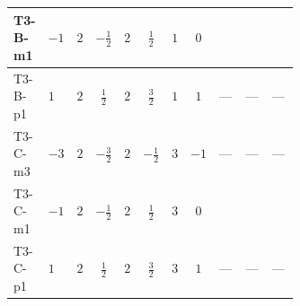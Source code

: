 \documentclass[8pt]{article}
\begin{document}
\begin{landscape}
\begin{longtable}{@{}llcccccc >{\raggedright\arraybackslash}p{0.21\linewidth} >{\raggedright\arraybackslash}p{0.21\linewidth} >{\raggedright\arraybackslash}p{0.21\linewidth}@{}}
T3-B-m1 & $-1$ & $2$ & $-\frac{1}{2}$ & $2$ & $\frac{1}{2}$ & $1$ & $0$ & \scriptsize\adjustbox{max width=\linewidth}{$\begin{gathered} +{\lambda_{H H^\dagger S_1^\dagger S_2^\dagger}^{\rm Cross}} \left(\frac{1}{2} \operatorname{Tr}\!\left({y_1}\,\left({y_2}\right)^{\dagger}\right)+4 \left({\lambda_{H H^\dagger S_1^\dagger S_2^\dagger}^{\rm Cross}}\right)^{*}+3 \left({\lambda_{10}}\right)^{*}\right)\end{gathered}$} & \scriptsize\adjustbox{max width=\linewidth}{$\begin{gathered} +\frac{1}{2} \left({\lambda_{H H^\dagger S_1^\dagger S_2^\dagger}^{\rm Cross}}\right)^{*} \operatorname{Tr}\!\left({y_2}\,\left({y_1}\right)^{\dagger}\right)\end{gathered}$} & \scriptsize\adjustbox{max width=\linewidth}{$\begin{gathered} +3 {\lambda_{10}} \left({\lambda_{H H^\dagger S_1^\dagger S_2^\dagger}^{\rm Cross}}\right)^{*}\end{gathered}$} \\
\midrule
T3-B-p1 & $1$ & $2$ & $\frac{1}{2}$ & $2$ & $\frac{3}{2}$ & $1$ & $1$ & --- & --- & --- \\
\midrule
T3-C-m3 & $-3$ & $2$ & $-\frac{3}{2}$ & $2$ & $-\frac{1}{2}$ & $3$ & $-1$ & --- & --- & --- \\
\midrule
T3-C-m1 & $-1$ & $2$ & $-\frac{1}{2}$ & $2$ & $\frac{1}{2}$ & $3$ & $0$ & \scriptsize\adjustbox{max width=\linewidth}{$\begin{gathered} +{\lambda_{H H^\dagger S_1^\dagger S_2^\dagger}^{\rm Cross}} \left(\frac{3}{4} \operatorname{Tr}\!\left({y_1}\,\left({y_2}\right)^{\dagger}\right)+4 \left({\lambda_{H H^\dagger S_1^\dagger S_2^\dagger}^{\rm Cross}}\right)^{*}+3 \left({\lambda_{10}}\right)^{*}\right)\end{gathered}$} & \scriptsize\adjustbox{max width=\linewidth}{$\begin{gathered} +\frac{3}{4} \left({\lambda_{H H^\dagger S_1^\dagger S_2^\dagger}^{\rm Cross}}\right)^{*} \operatorname{Tr}\!\left({y_2}\,\left({y_1}\right)^{\dagger}\right)\end{gathered}$} & \scriptsize\adjustbox{max width=\linewidth}{$\begin{gathered} +3 {\lambda_{10}} \left({\lambda_{H H^\dagger S_1^\dagger S_2^\dagger}^{\rm Cross}}\right)^{*}\end{gathered}$} \\
\midrule
T3-C-p1 & $1$ & $2$ & $\frac{1}{2}$ & $2$ & $\frac{3}{2}$ & $3$ & $1$ & --- & --- & --- \\

\end{longtable}
\end{landscape}
\end{document}
